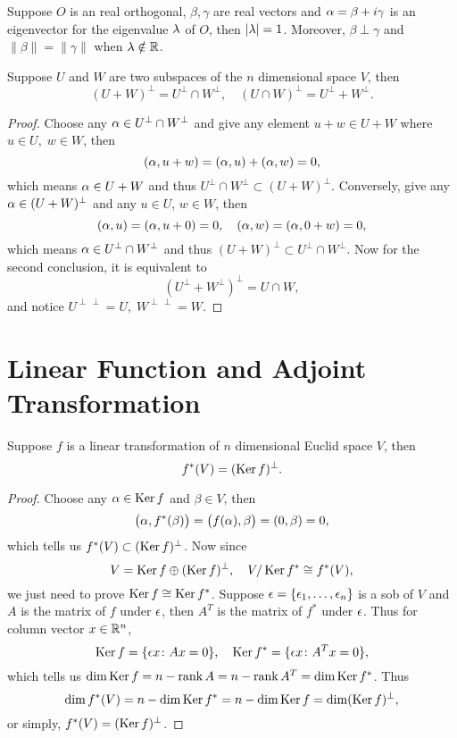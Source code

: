 \begin{pro}%
	Suppose $O$ is an real orthogonal, $\beta,\gamma$ are real vectors and $\alpha=\beta+i\gamma$ is an eigenvector for the eigenvalue $\lambda$ of $O$, then $|\lambda|=1$. Moreover, $\beta\perp \gamma$ and $\|\beta\|=\|\gamma\|$ when $\lambda\notin\mathbb{R}$.
\end{pro}

\begin{pro}%
	Suppose $U$ and $W$ are two subspaces of the $n$ dimensional space $V$, then
	\[(U+W)^{\perp}=U^{\perp}\cap W^{\perp},\quad (U\cap W)^{\perp}=U^{\perp}+W^{\perp}.\]
\end{pro}
\begin{proof}
	Choose any $\alpha\in U^{\perp}\cap W^{\perp}$ and give any element $u+w\in U+W$ where $u\in U,\; w\in W$, then 
	\[(\alpha,u+w)=(\alpha,u)+(\alpha,w)=0,\]
	which means $\alpha\in U+W$ and thus $U^{\perp}\cap W^{\perp}\subset (U+W)^{\perp}$. Conversely, give any $\alpha\in (U+W)^{\perp}$ and any $u\in U$, $w\in W$, then
	\[(\alpha,u)=(\alpha,u+0)=0,\quad (\alpha,w)=(\alpha,0+w)=0,\]
	which means $\alpha\in U^{\perp}\cap W^{\perp}$ and thus $(U+W)^{\perp}\subset U^{\perp}\cap W^{\perp}$. Now for the second conclusion, it is equivalent to
	\[(U^{\perp}+W^{\perp})^{\perp}=U\cap W,\]
	and notice $U^{\perp\,\perp}=U,\; W^{\perp\,\perp}=W$.
\end{proof}

\section{Linear Function and Adjoint Transformation}
\begin{pro}%
	Suppose $f$ is a linear transformation of $n$ dimensional Euclid space $V$, then
	\[f^*(V)=(\operatorname*{Ker} f)^{\perp}.\]
\end{pro}
\begin{proof}
	Choose any $\alpha\in\operatorname*{Ker} f$ and $\beta \in V$, then
	\[\big(\alpha,f^*(\beta)\big)=\big(f(\alpha),\beta\big)=(0,\beta)=0,\]
	which tells us $f^*(V)\subset (\operatorname*{Ker} f)^{\perp}$. Now since
	\[V=\operatorname*{Ker} f\oplus (\operatorname*{Ker} f)^{\perp},\quad V/\operatorname*{Ker} f^*\cong f^*(V),\]
	we just need to prove $\operatorname*{Ker} f\cong \operatorname*{Ker} f^*$. Suppose $\epsilon=\{\epsilon_1,\dots,\epsilon_n\}$ is a sob of $V$ and $A$ is the matrix of $f$ under $\epsilon$, then $A^T$ is the matrix of $f^*$ under $\epsilon$. Thus for column vector $x\in\mathbb{R}^n$,
	\[\operatorname*{Ker} f=\{\epsilon x\colon Ax=0\},\quad \operatorname*{Ker} f^*=\{\epsilon x\colon A^T x=0\},\]
	which tells us $\dim\operatorname*{Ker} f=n-\operatorname*{rank} A=n-\operatorname*{rank} A^T=\dim\operatorname*{Ker} f^*$. Thus
	\[\dim f^*(V)=n-\dim\operatorname*{Ker} f^*=n-\dim\operatorname*{Ker} f=\dim (\operatorname*{Ker} f)^{\perp},\]
	or simply, $f^*(V)=(\operatorname*{Ker} f)^{\perp}$.
\end{proof}

